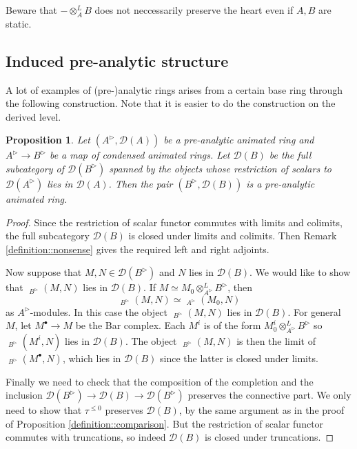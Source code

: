\documentclass{article}
\theoremstyle{plain}
\newtheorem{prop}[thm]{Proposition}
\theoremstyle{definition}
\theoremstyle{remark}
\DeclareMathOperator{\rhoms}{\underline{RHom}}
\newcommand{\dten}{\otimes ^{L}}
\newcommand{\huflag}{\triangleright}
\newcommand{\D}{\mathcal{D}}
\begin{document}
Beware that $ -\dten _{A} B $ does not neccessarily preserve the heart even if $ A,B $ are static.

\subsection{Induced pre-analytic structure}

A lot of examples of (pre-)analytic rings arises from a certain base ring through the following construction.
Note that it is easier to do the construction on the derived level.
\begin{prop}
Let $ (A ^{\huflag}, \D (A)) $ be a pre-analytic animated ring and $ A ^{\huflag}\to B ^{\huflag} $ be a map of condensed animated rings.
Let $ \D (B) $ be the full subcategory of $ \D (B ^{\huflag}) $ spanned by the objects whose restriction of scalars to $ \D (A ^{\huflag}) $
lies in $ \D (A) $. Then the pair $ (B ^{\huflag}, \D (B)) $ is a pre-analytic animated ring.
\end{prop}

\begin{proof}
Since the restriction of scalar functor commutes with limits and colimits, the full subcategory
$ \D (B) $ is closed under limits and colimits.
Then Remark \ref{definition::nonsense} gives the required left and right adjoints.

Now suppose that $ M, N\in \D (B ^{\huflag}) $ and $ N $ lies in $ \D (B) $.
We would like to show that $ \rhoms _{B ^{\huflag}}(M, N) $ lies in $ \D (B) $.
If $ M \simeq M_0 \dten _{A ^{\huflag}} B ^{\huflag} $,
then
\begin{equation*}
\rhoms _{B ^{\huflag}}(M, N)\simeq \rhoms _{A ^{\huflag}}(M_0, N)
\end{equation*}
as $ A ^{\huflag} $-modules.
In this case the object $ \rhoms _{B ^{\huflag}}(M, N) $ lies in $ \D (B) $.
For general $ M $, let $ M ^{\bullet}\to M $ be the Bar complex. Each $ M ^{i} $ is of the form $ M ^{i}_{0}\dten _{A ^{\huflag}}B ^{\huflag} $
so $ \rhoms _{B ^{\huflag}}(M ^{i}, N) $ lies in $ \D (B) $.
The object $ \rhoms _{B ^{\huflag}}(M, N) $ is then the limit of $ \rhoms _{B ^{\huflag}}(M ^{\bullet}, N) $,
which lies in $ \D (B) $ since the latter is closed under limits.

Finally we need to check that the composition of the completion and the inclusion
$ \D (B ^{\huflag})\to \D (B)\to \D (B ^{\huflag}) $ preserves the connective part.
We only need to show that $ \tau ^{\leq 0} $ preserves $ \D (B) $, by the same argument as in the proof of Proposition
\ref{definition::comparison}.
But the restriction of scalar functor commutes with truncations, so indeed $ \D (B) $ is closed under truncations.
\end{proof}
\end{document}
